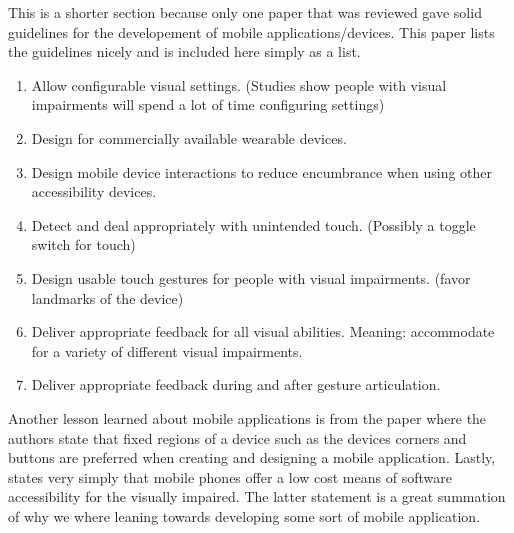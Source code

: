 \documentclass{article}
\begin{document}
\par This is a shorter section because only one paper that was reviewed gave solid guidelines for the developement of mobile applications/devices. This paper \cite{doi:10.1080/10447318.2017.1279827} lists the guidelines nicely and is included here simply as a list.
\begin{enumerate}
    \item Allow configurable visual settings. (Studies show people with visual impairments will spend a lot of time configuring settings) 
    \item Design for commercially available wearable devices. 
    \item Design mobile device interactions to reduce encumbrance when using other accessibility devices.
    \item Detect and deal appropriately with unintended touch. (Possibly a toggle switch for touch) 
    \item Design usable touch gestures for people with visual impairments. (favor landmarks of the device)
    \item Deliver appropriate feedback for all visual abilities. Meaning: accommodate for a variety of different visual impairments.
    \item Deliver appropriate feedback during and after gesture articulation.
\end{enumerate}
Another lesson learned about mobile applications is from the paper \cite{RODRIGUEZSANCHEZ20147210} where the authors state that fixed regions of a device such as the devices corners and buttons are preferred when creating and designing a mobile application. Lastly, \cite{bandyopadhyay2017sound} states very simply that mobile phones offer a low cost means of software accessibility for the visually impaired. The latter statement is a great summation of why we where leaning towards developing some sort of mobile application.
\end{document}
